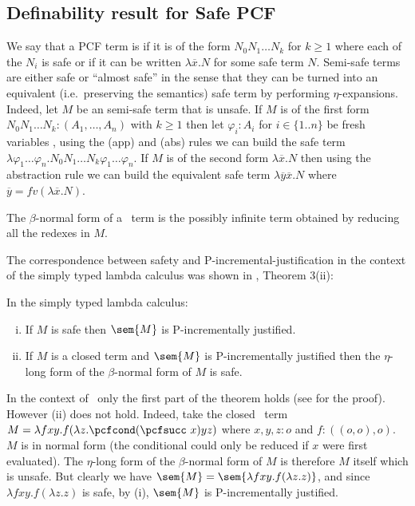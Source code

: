 \subsection{Definability result for Safe PCF}

We say that a PCF term is  if it is of the form $N_0 N_1 \ldots N_k$ for $k\geq 1$ where each of the $N_i$ is safe or if it can be written $\lambda \overline{x} . N$ for some safe term $N$. Semi-safe terms are either safe or ``almost safe'' in the sense that they can be turned into an equivalent (i.e.~preserving the semantics) safe term  by performing $\eta$-expansions. Indeed, let $M$ be an semi-safe term that is unsafe.
If $M$ is of the first form $N_0 N_1 \ldots N_k : (A_1,\ldots,A_n)$ with $k\geq 1$ then let $\varphi_i:A_i$ for $i\in\{1..n\}$ be fresh variables , using the (app) and (abs) rules we can build the safe term $\lambda \varphi_1 \ldots \varphi_n . N_0 N_1 \ldots N_k \varphi_1 \ldots \varphi_n$. If $M$ is of the second form $\lambda \overline{x} . N$ then using the abstraction rule we can build the equivalent safe term $\lambda \overline{y} \overline{x}. N$  where $\overline{y} = fv(\lambda \overline{x}. N)$.

The $\beta$-normal form of a \pcf\ term is the possibly infinite term obtained by reducing all the redexes in $M$.

The correspondence between safety and P-incremental-justification in the context of the simply typed lambda calculus was shown
in \cite{blumong:safelambdacalculus}, Theorem 3(ii):

\begin{theorem}
\label{thm:safeincrejust} In the simply typed lambda calculus:
\begin{enumerate}[(i)]
\item If $M$ is safe then $\sem{M}$ is P-incrementally justified.
\item If $M$ is a closed term and $\sem{M}$ is
  P-incrementally justified then the $\eta$-long form of the
  $\beta$-normal form of $M$ is safe.
\end{enumerate}
\end{theorem}

In the context of \pcf\, only the first part of the theorem holds (see \cite{blumtransfer} for the proof). However (ii) does not hold. Indeed, take the closed \pcf\ term $M = \lambda f x y. f (\lambda z. \pcfcond (\pcfsucc\ x) y z )$ where $x,y,z:o$ and $f:((o,o),o)$. $M$ is in normal form (the conditional  could  only be reduced if $x$ were first evaluated). The $\eta$-long form of the $\beta$-normal form of $M$ is therefore $M$ itself which is unsafe.
But clearly we have $\sem{M} = \sem{\lambda f x y. f (\lambda z. z)}$, and since  $\lambda f x y. f (\lambda z. z)$ is safe, by (i), $\sem{M}$ is P-incrementally justified.

